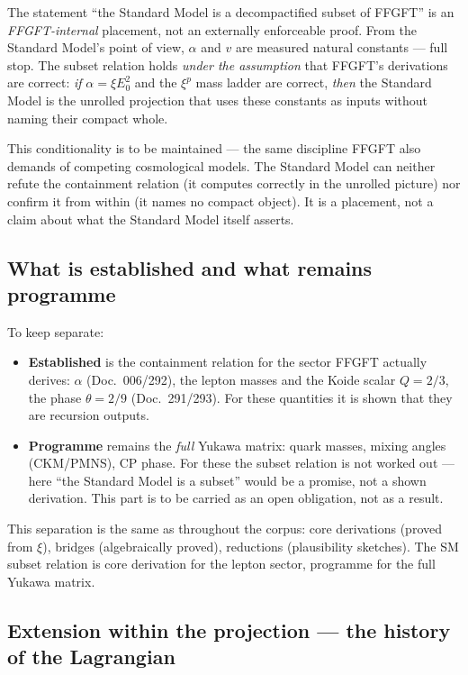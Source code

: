 \medskip
The statement \enquote{the Standard Model is a decompactified subset of FFGFT}
is an \emph{FFGFT-internal} placement, not an externally enforceable proof.
From the Standard Model's point of view, $\alpha$ and $v$ are measured natural
constants --- full stop. The subset relation holds \emph{under the assumption}
that FFGFT's derivations are correct: \emph{if} $\alpha = \xi E_0^2$ and the
$\xi^p$ mass ladder are correct, \emph{then} the Standard Model is the unrolled
projection that uses these constants as inputs without naming their compact
whole.

This conditionality is to be maintained --- the same discipline FFGFT also
demands of competing cosmological models. The Standard Model can neither refute
the containment relation (it computes correctly in the unrolled picture) nor
confirm it from within (it names no compact object). It is a placement, not a
claim about what the Standard Model itself asserts.

\subsection*{What is established and what remains programme}

To keep separate:

\begin{itemize}
  \item \textbf{Established} is the containment relation for the sector FFGFT
    actually derives: $\alpha$ (Doc.~006/292), the lepton masses and the Koide
    scalar $Q = 2/3$, the phase $\theta = 2/9$ (Doc.~291/293). For these
    quantities it is shown that they are recursion outputs.
  \item \textbf{Programme} remains the \emph{full} Yukawa matrix: quark masses,
    mixing angles (CKM/PMNS), CP phase. For these the subset relation is not
    worked out --- here \enquote{the Standard Model is a subset} would be a
    promise, not a shown derivation. This part is to be carried as an open
    obligation, not as a result.
\end{itemize}

This separation is the same as throughout the corpus: core derivations (proved
from $\xi$), bridges (algebraically proved), reductions (plausibility
sketches). The SM subset relation is core derivation for the lepton sector,
programme for the full Yukawa matrix.

\subsection*{Extension within the projection --- the history of the Lagrangian}

